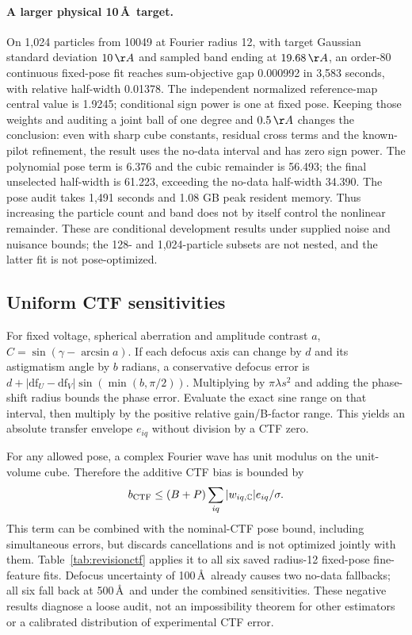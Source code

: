 \paragraph{A larger physical 10\,\AA\ target.}
On 1,024 particles from 10049 at Fourier radius 12, with target Gaussian
standard deviation $10\,\AA$ and sampled band ending at $19.68\,\AA$, an order-80 continuous
fixed-pose fit reaches sum-objective gap 0.000992 in 3,583 seconds, with
relative half-width 0.01378. The independent normalized reference-map central
value is 1.9245; conditional sign power is one at fixed pose. Keeping those
weights and auditing a joint ball of one degree and $0.5\,\AA$ changes the
conclusion: even with sharp cube constants, residual cross terms and the
known-pilot refinement, the result uses the no-data interval and has zero
sign power. The polynomial pose term is 6.376 and the cubic remainder is
56.493; the final unselected half-width is 61.223, exceeding the no-data
half-width 34.390. The pose audit takes 1,491 seconds and 1.08 GB peak
resident memory. Thus increasing the particle count and band does not by
itself control the nonlinear remainder. These are conditional development
results under supplied noise and nuisance bounds; the 128- and 1,024-particle
subsets are not nested, and the latter fit is not pose-optimized.



\subsection{Uniform CTF sensitivities}
For fixed voltage, spherical aberration and amplitude contrast $a$,
$C=\sin(\gamma-\arcsin a)$. If each defocus axis can change by $d$ and its
astigmatism angle by $b$ radians, a conservative defocus error is
$d+|\mathrm{df}_U-\mathrm{df}_V|\sin(\min(b,\pi/2))$. Multiplying by
$\pi\lambda s^2$ and adding the phase-shift radius bounds the phase error.
Evaluate the exact sine range on that interval, then multiply by the positive
relative gain/B-factor range. This yields an absolute transfer envelope
$e_{iq}$ without division by a CTF zero.

For any allowed pose, a complex Fourier wave has unit modulus on the unit-volume
cube. Therefore the additive CTF bias is bounded by
\begin{equation}
 b_{\rm CTF}\le (B+P)\sum_{iq}
       |w_{iq,\mathbb C}|e_{iq}/\sigma.
\end{equation}
This term can be combined with the nominal-CTF pose bound, including simultaneous
errors, but discards cancellations and is not optimized jointly with them.
Table~\ref{tab:revisionctf} applies it to all six saved radius-12 fixed-pose
fine-feature fits. Defocus uncertainty of 100\,\AA\ already causes two no-data
fallbacks; all six fall back at 500\,\AA\ and under the combined sensitivities.
These negative results diagnose a loose audit, not an impossibility theorem for
other estimators or a calibrated distribution of experimental CTF error.


